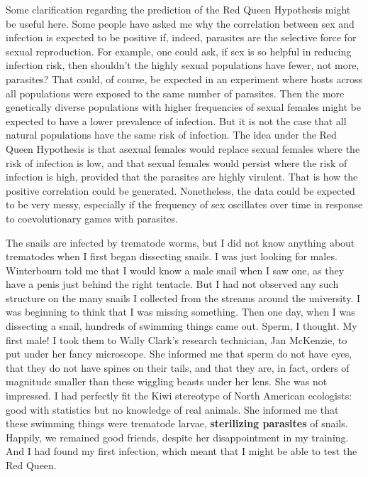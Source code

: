 \documentclass[
  american,
  letterpaper,
]{book}
\begin{document}
Some clarification regarding the prediction of the Red Queen Hypothesis
might be useful here. Some people have asked me why the correlation
between sex and infection is expected to be positive if, indeed,
parasites are the selective force for sexual reproduction. For example,
one could ask, if sex is so helpful in reducing infection risk, then
shouldn't the highly sexual populations have fewer, not more, parasites?
That could, of course, be expected in an experiment where hosts across
all populations were exposed to the same number of parasites. Then the
more genetically diverse populations with higher frequencies of sexual
females might be expected to have a lower prevalence of infection. But
it is not the case that all natural populations have the same risk of
infection. The idea under the Red Queen Hypothesis is that asexual
females would replace sexual females where the risk of infection is low,
and that sexual females would persist where the risk of infection is
high, provided that the parasites are highly virulent. That is how the
positive correlation could be generated. Nonetheless, the data could be
expected to be very messy, especially if the frequency of sex oscillates
over time in response to coevolutionary games with parasites.

The snails are infected by trematode worms, but I did not know anything
about trematodes when I first began dissecting snails. I was just
looking for males. Winterbourn told me that I would know a male snail
when I saw one, as they have a penis just behind the right tentacle. But
I had not observed any such structure on the many snails I collected
from the streams around the university. I was beginning to think that I
was missing something. Then one day, when I was dissecting a snail,
hundreds of swimming things came out. Sperm, I thought. My first male! I
took them to Wally Clark's research technician, Jan McKenzie, to put
under her fancy microscope. She informed me that sperm do not have eyes,
that they do not have spines on their tails, and that they are, in fact,
orders of magnitude smaller than these wiggling beasts under her lens.
She was not impressed. I had perfectly fit the Kiwi stereotype of North
American ecologists: good with statistics but no knowledge of real
animals. She informed me that these swimming things were trematode
larvae, \textbf{sterilizing parasites} of snails. Happily, we remained
good friends, despite her disappointment in my training. And I had found
my first infection, which meant that I might be able to test the Red
Queen.
\end{document}
